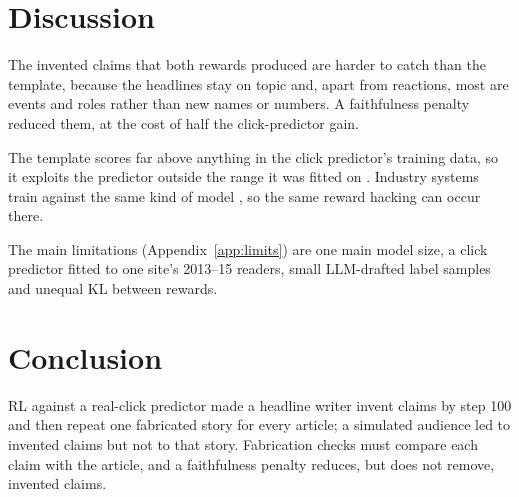 \section{Discussion}
The invented claims that both rewards produced are harder to catch than the template, because the headlines stay on topic and, apart from reactions, most are events and roles rather than new names or numbers. A faithfulness penalty reduced them, at the cost of half the click-predictor gain.

The template scores far above anything in the click predictor's training data, so it exploits the predictor outside the range it was fitted on \citep{gao2023scaling}. Industry systems train against the same kind of model \citep{jiang2025rlpf,chen2026gese}, so the same reward hacking can occur there.

The main limitations (Appendix~\ref{app:limits}) are one main model size, a click predictor fitted to one site's 2013--15 readers, small LLM-drafted label samples and unequal KL between rewards.

\section{Conclusion}
RL against a real-click predictor made a headline writer invent claims by step 100 and then repeat one fabricated story for every article; a simulated audience led to invented claims but not to that story. Fabrication checks must compare each claim with the article, and a faithfulness penalty reduces, but does not remove, invented claims.
